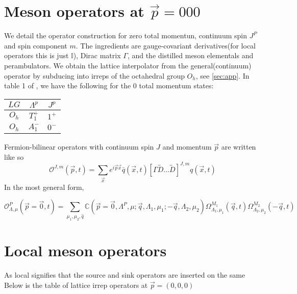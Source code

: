 \section{Meson operators at $\vec{p}=000$}
We detail the operator construction for zero total momentun, continuum spin $J^P$ and spin component $m$. The ingredients are gauge-covariant derivatives(for local operators this is just $\mathbb{I}$), Dirac matrix $\Gamma$, and the distilled meson elementals and perambulators. We obtain the lattice interpolator from the general(continuum) operator by subducing into irreps of the octahedral group $O_h$, see \ref{sec:app}. In table 1 of \cite{Cheung_2017}, we have the following for the 0 total momentum states: 
\begin{table}
    \begin{tabular}{ccc}
    $LG$ & $\Lambda^p$ & $J^p$ \\
    \hline
    $O_h$ & $T_1^+$ & $1^+$ \\
    $O_h$ & $A_1^-$ & $0^-$ \\
\end{tabular}
Fermion-bilinear operators with continuum spin $J$ and momentum $\vec{p}$ are written like so \cite{Cheung_2017}
    \begin{equation}
    \mathcal{O}^{J,m}(\vec{p},t) = \sum_{\vec{x}} e^{i\vec{p}\vec{x}} \bar{q}(\vec{x},t) [\Gamma \overleftrightarrow{D}\dots \overleftrightarrow{D}]^{J,m}q(\vec{x},t)
\end{equation}
In the most general form,

\begin{equation}
    \mathcal{O}_{\Lambda,\mu}^P(\vec{p}=\vec{0},t) = \sum_{\mu_1,\mu_2,\hat{q}} \mathbb{C}(\vec{p} = \vec{0},\Lambda^P,\mu;\vec{q},\Lambda_1,\mu_1;-\vec{q},\Lambda_2,\mu_2) \Omega^{M_1}_{\Lambda_1,\mu_1}(\vec{q},t) \Omega^{M_2}_{\Lambda_2,\mu_2}(-\vec{q},t)
\end{equation}

\section{Local meson operators}

As local signifies that the source and sink operators are inserted on the same
Below is the table of lattice irrep operators at $\vec{p} = (0,0,0)$ \cite{Dudek_2008}


\end{table}
